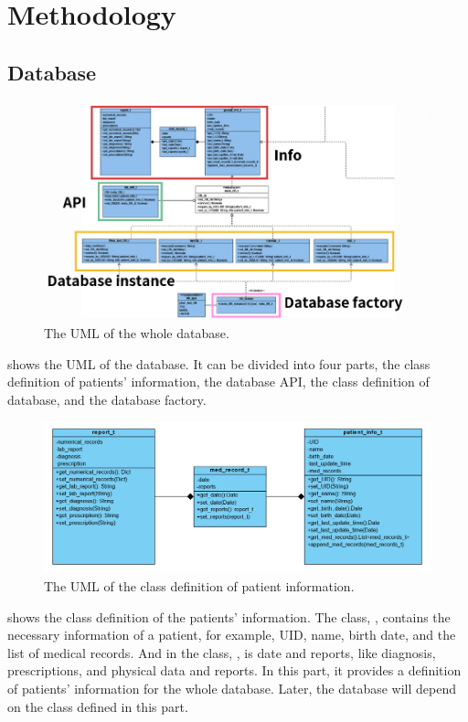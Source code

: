 \documentclass{article}
\begin{document}
\section{Methodology}
\label{sec:methodology}
  \subsection*{Database}
  \begin{figure}[h]
    \centering
    \includegraphics[scale = 0.6]{asset/database/DB_UML.png}
    \caption{The UML of the whole database.}
    \label{fig:DB_UML}
  \end{figure}
   shows the UML of the database. It can be divided into four 
  parts, the class definition of patients' information, the database API, the 
  class definition of database, and the database factory. 

  \begin{figure}[h]
    \centering
    \includegraphics[scale = 0.35]{asset/database/pinfo.png}
    \caption{The UML of the class definition of patient information.}
    \label{fig:pinfo_UML}
  \end{figure}
   shows the class definition of the patients' information. 
  The class, , contains the necessary information of 
  a patient, for example, UID, name, birth date, and the list of medical records. 
  And in the class, , is date and reports, like diagnosis, 
  prescriptions, and physical data and reports. 
  In this part, it provides a definition of patients' information for the whole 
  database. Later, the database will depend on the class defined in this part. 
\end{document}
